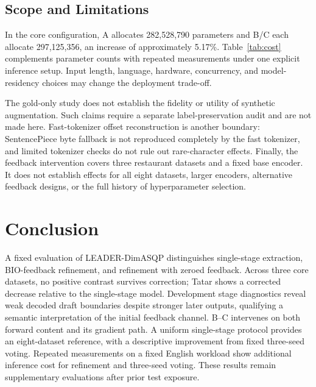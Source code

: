 \documentclass[conference]{IEEEtran}
\begin{document}
\subsection{Scope and Limitations}
In the core configuration, A allocates 282,528,790 parameters and B/C each allocate 297,125,356, an increase of approximately 5.17\%. Table~\ref{tab:cost} complements parameter counts with repeated measurements under one explicit inference setup. Input length, language, hardware, concurrency, and model-residency choices may change the deployment trade-off.

The gold-only study does not establish the fidelity or utility of synthetic augmentation. Such claims require a separate label-preservation audit and are not made here. Fast-tokenizer offset reconstruction is another boundary: SentencePiece byte fallback is not reproduced completely by the fast tokenizer, and limited tokenizer checks do not rule out rare-character effects. Finally, the feedback intervention covers three restaurant datasets and a fixed base encoder. It does not establish effects for all eight datasets, larger encoders, alternative feedback designs, or the full history of hyperparameter selection.

\section{Conclusion}
A fixed evaluation of LEADER-DimASQP distinguishes single-stage extraction, BIO-feedback refinement, and refinement with zeroed feedback. Across three core datasets, no positive contrast survives correction; Tatar shows a corrected decrease relative to the single-stage model. Development stage diagnostics reveal weak decoded draft boundaries despite stronger later outputs, qualifying a semantic interpretation of the initial feedback channel. B--C intervenes on both forward content and its gradient path. A uniform single-stage protocol provides an eight-dataset reference, with a descriptive improvement from fixed three-seed voting. Repeated measurements on a fixed English workload show additional inference cost for refinement and three-seed voting. These results remain supplementary evaluations after prior test exposure.
\end{document}
